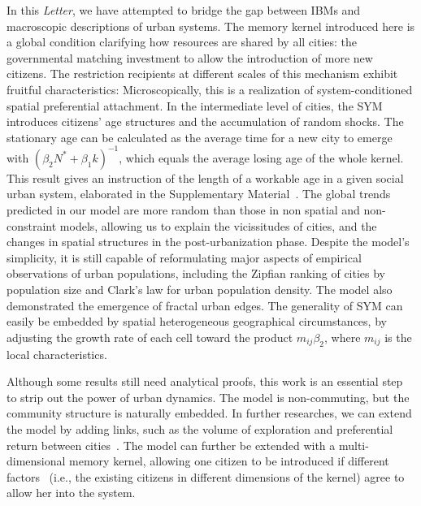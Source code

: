 \documentclass[reprint,unsortedaddress,amsmath,amssymb,aps,prl,showkeys]{revtex4-2}
\begin{document}
In this \textit{Letter}, we have attempted to bridge the gap between IBMs and macroscopic descriptions of urban systems. The memory kernel introduced here is a global condition clarifying how resources are shared by all cities: the governmental matching investment to allow the introduction of more new citizens. The restriction recipients at different scales of this mechanism exhibit fruitful characteristics: Microscopically, this is a realization of system-conditioned spatial preferential attachment. In the intermediate level of cities, the SYM introduces citizens' age structures and the accumulation of random shocks. The stationary age can be calculated as the average time for a new city to emerge with $(\beta_2 N^* + \beta_1 k)^{-1}$, which equals the average losing age of the whole kernel. This result gives an instruction of the length of a workable age in a given social urban system, elaborated in the Supplementary Material~\cite{SuppInfo}. The global trends predicted in our model are more random than those in non spatial and non-constraint models, allowing us to explain the vicissitudes of cities, and the changes in spatial structures in the post-urbanization phase. Despite the model's simplicity, it is still capable of reformulating major aspects of empirical observations of urban populations, including the Zipfian ranking of cities by population size and Clark's law for urban population density. The model also demonstrated the emergence of fractal urban edges. The generality of SYM can easily be embedded by spatial heterogeneous geographical circumstances, by adjusting the growth rate of each cell toward the product $m_{ij}\beta_2$, where $m_{ij}$ is the local characteristics.

Although some results still need analytical proofs, this work is an essential step to strip out the power of urban dynamics. The model is non-commuting, but the community structure is naturally embedded. In further researches, we can extend the model by adding links, such as the volume of exploration and preferential return between cities~\cite{WANG2019121921}. The model can further be extended with a multi-dimensional memory kernel, allowing one citizen to be introduced if different factors~\cite{tokita2020social} (i.e., the existing citizens in different dimensions of the kernel) agree to allow her into the system.




\end{document}
